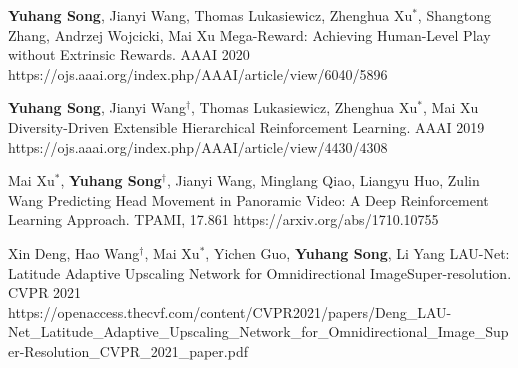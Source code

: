     \Conference
    {\textbf{Yuhang Song}, 
    Jianyi Wang, 
    Thomas Lukasiewicz, 
    Zhenghua Xu$^*$, 
    Shangtong Zhang, 
    Andrzej Wojcicki, 
    Mai Xu}
    {Mega-Reward: Achieving Human-Level Play without Extrinsic Rewards.}
    {AAAI 2020}
    {https://ojs.aaai.org/index.php/AAAI/article/view/6040/5896}
    
    \Conference
    {\textbf{Yuhang Song}, 
    Jianyi Wang$^\dag$,
    Thomas Lukasiewicz,
    Zhenghua Xu$^*$, 
    Mai Xu}
    {Diversity-Driven Extensible Hierarchical Reinforcement Learning.}
    {AAAI 2019}
    {https://ojs.aaai.org/index.php/AAAI/article/view/4430/4308}
	
	\Journal
	{Mai Xu$^*$, 
    \textbf{Yuhang Song}$^\dag$,
    Jianyi Wang, 
    Minglang Qiao, 
    Liangyu Huo,
    Zulin Wang}
    {Predicting Head Movement in Panoramic Video: A Deep Reinforcement Learning Approach.}
    {TPAMI, 17.861}
    {https://arxiv.org/abs/1710.10755}
	
    \Conference
    {Xin Deng, 
    Hao Wang$^\dag$, 
    Mai Xu$^*$, 
    Yichen Guo, 
    \textbf{Yuhang Song},
    Li Yang}
    {LAU-Net: Latitude Adaptive Upscaling Network for Omnidirectional ImageSuper-resolution.}
    {CVPR 2021}
    {https://openaccess.thecvf.com/content/CVPR2021/papers/Deng_LAU-Net_Latitude_Adaptive_Upscaling_Network_for_Omnidirectional_Image_Super-Resolution_CVPR_2021_paper.pdf}
    
